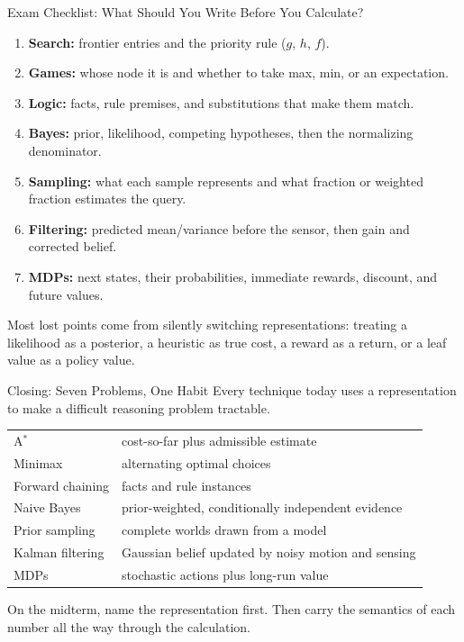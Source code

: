 \documentclass[aspectratio=169,10pt]{beamer}
\begin{document}
\begin{frame}{Exam Checklist: What Should You Write Before You Calculate?}
  \small
  \begin{enumerate}
    \item \textbf{Search:} frontier entries and the priority rule ($g$, $h$, $f$).
    \item \textbf{Games:} whose node it is and whether to take max, min, or an expectation.
    \item \textbf{Logic:} facts, rule premises, and substitutions that make them match.
    \item \textbf{Bayes:} prior, likelihood, competing hypotheses, then the normalizing denominator.
    \item \textbf{Sampling:} what each sample represents and what fraction or weighted fraction estimates the query.
    \item \textbf{Filtering:} predicted mean/variance before the sensor, then gain and corrected belief.
    \item \textbf{MDPs:} next states, their probabilities, immediate rewards, discount, and future values.
  \end{enumerate}
  \begin{keyidea}
    Most lost points come from silently switching representations: treating a likelihood as a posterior, a heuristic as true cost, a reward as a return, or a leaf value as a policy value.
  \end{keyidea}
\end{frame}

\begin{frame}{Closing: Seven Problems, One Habit}
  Every technique today uses a representation to make a difficult reasoning problem tractable.
  \begin{center}
    \renewcommand{\arraystretch}{1.45}
    \begin{tabular}{l|l}
      A$^*$ & cost-so-far plus admissible estimate \\
      Minimax & alternating optimal choices \\
      Forward chaining & facts and rule instances \\
      Naive Bayes & prior-weighted, conditionally independent evidence \\
      Prior sampling & complete worlds drawn from a model \\
      Kalman filtering & Gaussian belief updated by noisy motion and sensing \\
      MDPs & stochastic actions plus long-run value
    \end{tabular}
  \end{center}
  \begin{keyidea}
    On the midterm, name the representation first. Then carry the semantics of each number all the way through the calculation.
  \end{keyidea}
\end{frame}
\end{document}
